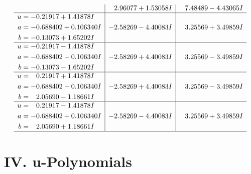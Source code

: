 \documentclass[1p]{elsarticle_modified}
\theoremstyle{definition}
\begin{document}
$$\begin{array}{c|c|c}
 & \phantom{-}2.96077 + 1.53058 I & \phantom{-}7.48489 - 4.43065 I \\ \hline\begin{aligned}
u &= -0.21917 + 1.41878 I \\
a &= -0.688402 + 0.106340 I \\
b &= -0.13073 + 1.65202 I\end{aligned}
 & -2.58269 - 4.40083 I & \phantom{-}3.25569 + 3.49859 I \\ \hline\begin{aligned}
u &= -0.21917 - 1.41878 I \\
a &= -0.688402 - 0.106340 I \\
b &= -0.13073 - 1.65202 I\end{aligned}
 & -2.58269 + 4.40083 I & \phantom{-}3.25569 - 3.49859 I \\ \hline\begin{aligned}
u &= \phantom{-}0.21917 + 1.41878 I \\
a &= -0.688402 - 0.106340 I \\
b &= \phantom{-}2.05690 - 1.18661 I\end{aligned}
 & -2.58269 + 4.40083 I & \phantom{-}3.25569 - 3.49859 I \\ \hline\begin{aligned}
u &= \phantom{-}0.21917 - 1.41878 I \\
a &= -0.688402 + 0.106340 I \\
b &= \phantom{-}2.05690 + 1.18661 I\end{aligned}
 & -2.58269 - 4.40083 I & \phantom{-}3.25569 + 3.49859 I\\
 \hline 
 \end{array}$$\newpage
\newpage\renewcommand{\arraystretch}{1}
\centering \section*{ IV. u-Polynomials}
\end{document}
